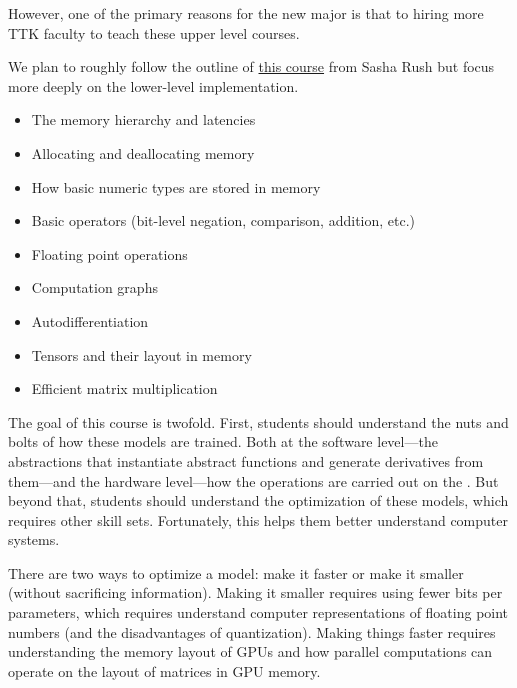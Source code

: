 However, one of the primary reasons for the new major is that to hiring more TTK faculty to teach these upper level courses.



We plan to roughly follow the outline of \href{https://minitorch.github.io/}{this course} from Sasha Rush but focus more deeply on the lower-level implementation.

\begin{itemize}
    \item The memory hierarchy and latencies 
    \item Allocating and deallocating memory
    \item How basic numeric types are stored in memory
    \item Basic operators (bit-level negation, comparison, addition, etc.)
    \item Floating point operations
    \item Computation graphs
    \item Autodifferentiation
    \item Tensors and their layout in memory
    \item Efficient matrix multiplication
\end{itemize}


The goal of this course is twofold.  First, students should understand the nuts and bolts of how these models are trained.  Both at the software level---the abstractions that instantiate abstract functions and generate derivatives from them---and the hardware level---how the operations are carried out on the .  But beyond that, students should understand the optimization of these models, which requires other skill sets.  Fortunately, this helps them better understand computer systems.

There are two ways to optimize a model: make it faster or make it smaller (without sacrificing information).  Making it smaller requires using fewer bits per parameters, which requires understand computer representations of floating point numbers (and the disadvantages of quantization).  Making things faster requires understanding the memory layout of GPUs and how parallel computations can operate on the layout of matrices in GPU memory.

